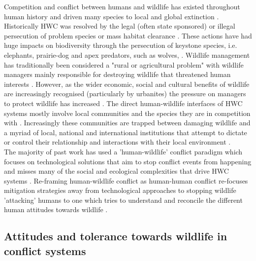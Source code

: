 Competition and conflict between humans and wildlife has existed throughout human history and driven many species to local and global extinction \cite{Graham2005,Woodroffe2005a}. Historically HWC was resolved by the legal (often state sponsored) or illegal persecution of problem species or mass habitat clearance \cite{Woodroffe2005a,treves2005evaluating}. These actions have had huge impacts on biodiversity through the persecution of keystone species, i.e. elephants, prairie-dog and apex predators, such as wolves, \cite{Woodroffe2005a,Kotliar1999,sinclair1995equilibria,Ripple2001}. Wildlife management has traditionally been considered a "rural or agricultural problem" \cite{Messmer2000} with wildlife managers mainly responsible for destroying wildlife that threatened human interests \cite{treves2005evaluating}. However, as the wider economic, social and cultural benefits of wildlife are increasingly recognised (particularly by urbanites) the pressure on managers to protect wildlife has increased \cite{treves2005evaluating}. The direct human-wildlife interfaces of HWC systems mostly involve local communities and the species they are in competition with \cite{Thirgood2005}. Increasingly these communities are trapped between damaging wildlife and a myriad of local, national and international institutions that attempt to dictate or control their relationship and interactions with their local environment \cite{naughton2005socio}.\\

The majority of past work has used a 'human-wildlife' conflict paradigm \cite{Dickman2010b,Peterson2010b,Redpath2014b} which focuses on technological solutions that aim to stop conflict events from happening \cite{naughton2005socio} and misses many of the social and ecological complexities that drive HWC systems \cite{Redpath2014b}. Re-framing human-wildlife conflict as human-human conflict re-focuses mitigation strategies away from technological approaches to stopping wildlife 'attacking' humans to one which tries to understand and reconcile the different human attitudes towards wildlife \cite{Redpath2014b}.\\

\subsection{Attitudes and tolerance towards wildlife in conflict systems}

